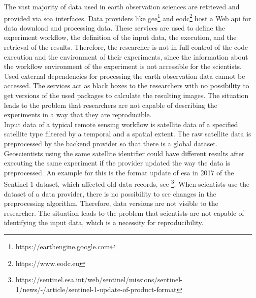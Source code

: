 \documentclass[draft,final]{vutinfth} %
\begin{document}
The vast majority of data used in earth observation sciences are retrieved and provided via \gls{soa} interfaces. Data providers like \gls{gee}\footnote{https://earthengine.google.com} and \gls{eodc}\footnote{https://www.eodc.eu} host a Web \gls{api} for data download and processing data. These services are used to define the experiment workflow, the definition of the input data, the execution, and the retrieval of the results. Therefore, the researcher is not in full control of the code execution and the environment of their experiments, since the information about the workflow environment of the experiment is not accessible for the scientists. Used external dependencies for processing the earth observation data cannot be accessed. The services act as black boxes to the researchers with no possibility to get versions of the used packages to calculate the resulting images. The situation leads to the problem that researchers are not capable of describing the experiments in a way that they are reproducible. \\
Input data of a typical remote sensing workflow is satellite data of a specified satellite type filtered by a temporal and a spatial extent. The raw satellite data is preprocessed by the backend provider so that there is a global dataset. Geoscientists using the same satellite identifier could have different results after executing the same experiment if the provider updated the way the data is preprocessed. An example for this is the format update of \gls{esa} in 2017 of the Sentinel 1 dataset, which affected old data records, see \footnote{https://sentinel.esa.int/web/sentinel/missions/sentinel-1/news/-/article/sentinel-1-update-of-product-format}. When scientists use the dataset of a data provider, there is no possibility to see changes in the preprocessing algorithm. Therefore, data versions are not visible to the researcher. The situation leads to the problem that scientists are not capable of identifying the input data, which is a necessity for reproducibility.

\end{document}
